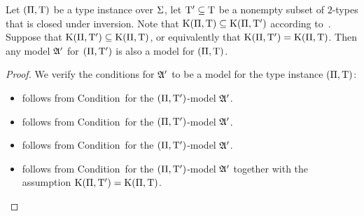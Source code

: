 \begin{remark}\label{rem:tpi-sub-ex}
Let $(\Pi,\mathrm{T})$ be a type instance over $\mathrm{\Sigma}$, let ${\mathrm{T}'} \subseteq
\mathrm{T}$ be a nonempty subset of $2$-types that is closed under inversion.
Note that $\mathrm{K}(\Pi,\mathrm{T}) \subseteq \mathrm{K}(\Pi,{\mathrm{T}'})$ according
to~.
Suppose that $\mathrm{K}(\Pi,{\mathrm{T}'}) \subseteq \mathrm{K}(\Pi,\mathrm{T})$, or equivalently that
$\mathrm{K}(\Pi,{\mathrm{T}'}) = \mathrm{K}(\Pi,\mathrm{T})$.
Then any model $\mathfrak{A'}$ for $(\Pi,{\mathrm{T}'})$ is also a model for $(\Pi,\mathrm{T})$.
\end{remark}
\begin{proof}
We verify the conditions for $\mathfrak{A'}$ to be a model for the type instance
$(\Pi,\mathrm{T})$:
\begin{itemize}
  \item[\refcondrealizI] follows from Condition~ for the
  $(\Pi,{\mathrm{T}'})$-model $\mathfrak{A'}$.
  \item[\refcondrealizII] follows from Condition~ for the
  $(\Pi,{\mathrm{T}'})$-model $\mathfrak{A'}$.
  \item[\refcondrealizp] follows from Condition~ for the
  $(\Pi,{\mathrm{T}'})$-model $\mathfrak{A'}$.
  \item[\refcondrealizk] follows from Condition~ for the
  $(\Pi,{\mathrm{T}'})$-model $\mathfrak{A'}$ together with the assumption
  $\mathrm{K}(\Pi,{\mathrm{T}'}) = \mathrm{K}(\Pi,\mathrm{T})$.
\end{itemize}
\end{proof}


